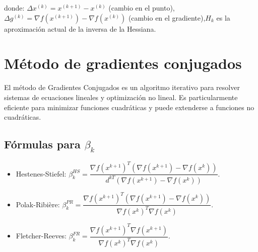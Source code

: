 donde: $\Delta x^{(k)} = x^{(k+1)} - x^{(k)}$ (cambio en el punto), $\Delta g^{(k)} = \nabla f(x^{(k+1)}) - \nabla f(x^{(k)})$ (cambio en el gradiente),$H_k$ es la aproximación actual de la inversa de la Hessiana.

\section{Método de gradientes conjugados}

El método de Gradientes Conjugados es un algoritmo iterativo para resolver sistemas de ecuaciones lineales y optimización no lineal. Es particularmente eficiente para minimizar funciones cuadráticas y puede extenderse a funciones no cuadráticas. 

\subsection[Fórmulas para \texorpdfstring{$\beta_k$}{bk}]{Fórmulas para \texorpdfstring{\boldmath$\beta_k$}{bk}}

\begin{itemize}
    \item Hestenes-Stiefel: $\beta_k^{HS} = \dfrac{\nabla f(x^{k+1})^T (\nabla f(x^{k+1}) - \nabla f(x^k))}{d^{kT}(\nabla f(x^{k+1}) - \nabla f(x^k))}$.
    \item Polak-Ribière: $\beta_k^{PR} = \dfrac{\nabla f(x^{k+1})^T (\nabla f(x^{k+1}) - \nabla f(x^k))}{\nabla f(x^k)^T \nabla f(x^k)}$.
    \item Fletcher-Reeves: $\beta_k^{FR} = \dfrac{\nabla f(x^{k+1})^T \nabla f(x^{k+1})}{\nabla f(x^k)^T \nabla f(x^k)}$.
\end{itemize}
